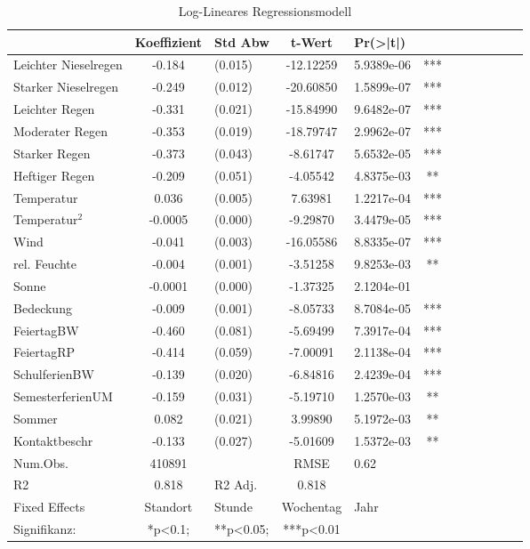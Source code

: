 \documentclass[a4paper,12pt]{thesis}
\begin{document}
\begin{table}[!ht]
	\centering
	\caption{Log-Lineares Regressionsmodell}
	\begin{tabular}[t]{lc lc lc lc lc lc}
		\toprule
		& Koeffizient & Std Abw & t-Wert & Pr(>|t|) & \\
		\midrule
		Leichter Nieselregen & -0.184 & (0.015) & -12.12259 & 5.9389e-06 & ***\\
		Starker Nieselregen & -0.249 & (0.012) & -20.60850 & 1.5899e-07 & ***\\
		Leichter Regen & -0.331 & (0.021) & -15.84990 & 9.6482e-07 & ***\\
		Moderater Regen & -0.353 & (0.019) & -18.79747 & 2.9962e-07 & ***\\
		Starker Regen & -0.373 & (0.043) & -8.61747 & 5.6532e-05 & ***\\
		Heftiger Regen & -0.209 & (0.051) & -4.05542 & 4.8375e-03 & **\\
		Temperatur & 0.036 & (0.005) & 7.63981 & 1.2217e-04 & ***\\
		Temperatur$^2$ & -0.0005 & (0.000) & -9.29870 & 3.4479e-05 & ***\\
		Wind & -0.041 & (0.003) & -16.05586 & 8.8335e-07 & ***\\
		rel. Feuchte & -0.004 & (0.001) & -3.51258 & 9.8253e-03 & **\\
		Sonne & -0.0001 & (0.000) & -1.37325 & 2.1204e-01 & \\
		Bedeckung & -0.009 & (0.001) & -8.05733 & 8.7084e-05 & ***\\
		FeiertagBW & -0.460 & (0.081) & -5.69499 & 7.3917e-04 & ***\\
		FeiertagRP & -0.414 & (0.059) & -7.00091 & 2.1138e-04 & ***\\
		SchulferienBW & -0.139 & (0.020) & -6.84816 & 2.4239e-04 & ***\\
		SemesterferienUM & -0.159 & (0.031) & -5.19710 & 1.2570e-03 & **\\
		Sommer & 0.082 & (0.021) & 3.99890 & 5.1972e-03 & **\\
		Kontaktbeschr & -0.133 & (0.027) & -5.01609 & 1.5372e-03 & **\\
		\midrule
		Num.Obs. & 410891& & RMSE & 0.62 & \\
		R2 & 0.818& R2 Adj. & 0.818 &  & \\
		\bottomrule
		Fixed Effects & Standort & Stunde & Wochentag & Jahr & \\
		Signifikanz: & *p<0.1; & **p<0.05; &***p<0.01 & &\\
	\end{tabular}
\label{reg1}
\end{table}
\end{document}
